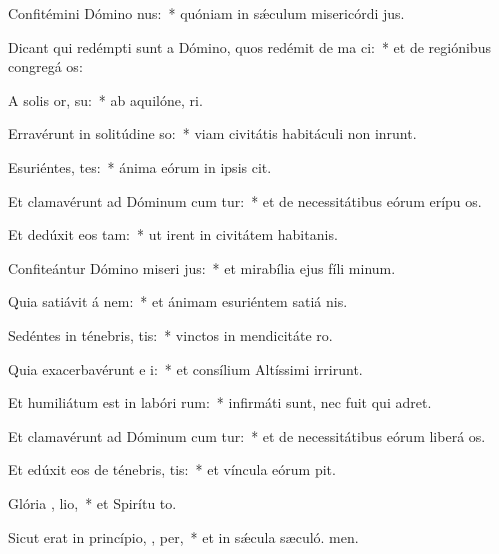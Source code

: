 \item Confitémini Dómino  nus:~* quóniam in sǽculum misericórdi jus.
\item Dicant qui redémpti sunt a Dómino, quos redémit de ma ci:~* et de regiónibus congregá os:
\item A solis or,  su:~* ab aquilóne,  ri.
\item Erravérunt in solitúdine  so:~* viam civitátis habitáculi non inrunt.
\item Esuriéntes,  tes:~* ánima eórum in ipsis cit.
\item Et clamavérunt ad Dóminum cum tur:~* et de necessitátibus eórum erípu os.
\item Et dedúxit eos   tam:~* ut irent in civitátem habitanis.
\item Confiteántur Dómino miseri jus:~* et mirabília ejus fíli minum.
\item Quia satiávit á nem:~* et ánimam esuriéntem satiá nis.
\item Sedéntes in ténebris,   tis:~* vinctos in mendicitáte  ro.
\item Quia exacerbavérunt e i:~* et consílium Altíssimi irrirunt.
\item Et humiliátum est in labóri  rum:~* infirmáti sunt, nec fuit qui adret.
\item Et clamavérunt ad Dóminum cum tur:~* et de necessitátibus eórum liberá os.
\item Et edúxit eos de ténebris,   tis:~* et víncula eórum pit.
\item Glória ,  lio,~* et Spirítu to.
\item Sicut erat in princípio,  ,  per,~* et in sǽcula sæculó. men.
